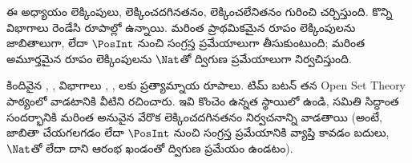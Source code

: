 \documentclass[../../../include/open-logic-chapter]{subfiles}
\begin{document}

\begin{editorial}
ఈ అధ్యాయం లెక్కింపులు, లెక్కించదగినతనం, లెక్కించలేనితనం గురించి చర్చిస్తుంది.
కొన్ని విభాగాలు రెండేసి రూపాల్లో ఉన్నాయి. మరింత ప్రాథమికమైన రూపం
లెక్కింపులను జాబితాలుగా, లేదా $\PosInt$ నుంచి సంగ్రస్త ప్రమేయాలుగా
తీసుకుంటుంది; మరింత అమూర్తమైన రూపం లెక్కింపులను $\Nat$తో ద్విగుణ
ప్రమేయాలుగా నిర్వచిస్తుంది.
\end{editorial}











\begin{editorial}
కిందివైన ,
,  విభాగాలు
, ,
లకు ప్రత్యామ్నాయ రూపాలు. టిమ్ బటన్ తన
Open Set Theory పాఠ్యంలో వాడటానికి వీటిని రచించారు. ఇవి కొంచెం ఉన్నత
స్థాయిలో ఉండి, సమితి సిద్ధాంత సందర్భానికి మరింత అనువైన వేరొక
లెక్కించదగినతనం నిర్వచనాన్ని వాడతాయి (అంటే, జాబితా చేయగలగడం లేదా
$\PosInt$ నుంచి సంగ్రస్త ప్రమేయానికి వ్యాప్తి కావడం బదులు, $\Nat$తో
లేదా దాని ఆరంభ ఖండంతో ద్విగుణ ప్రమేయం ఉండటం).
\end{editorial}


\OLEndChapterHook
\end{document}
